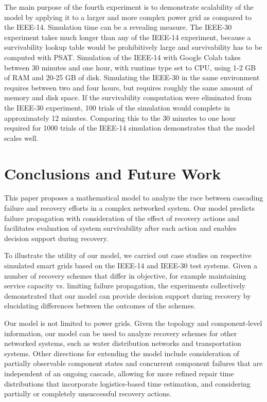 \documentclass[conference]{IEEEtran}
\begin{document}
The main purpose of the fourth experiment is to demonstrate scalability of the model by applying it to a larger and more complex power grid as compared to the IEEE-14. Simulation time can be a revealing measure. The IEEE-30 experiment takes much longer than any of the IEEE-14 experiment, because a survivability lookup table would be prohibitively large and survivability has to be computed with PSAT. Simulation of the IEEE-14 with Google Colab takes between 30 minutes and one hour, with runtime type set to CPU, using 1-2 GB of RAM and 20-25 GB of disk. Simulating the IEEE-30 in the same environment requires between two and four hours, but requires roughly the same amount of memory and disk space. If the survivability computation were eliminated from the IEEE-30 experiment, 100 trials of the simulation would complete in approximately 12 minutes. Comparing this to the 30 minutes to one hour required for 1000 trials of the IEEE-14 simulation demonstrates that the model scales well.

\section{Conclusions and Future Work}\label{sec:conclusions}

This paper proposes a mathematical model to analyze the race between cascading failure and recovery efforts in a complex networked system. Our model predicts failure propagation with consideration of the effect of recovery actions and facilitates evaluation of system survivability after each action and enables decision support during recovery.

To illustrate the utility of our model, we carried out case studies on respective simulated smart grids based on the IEEE-14 and IEEE-30 test systems. Given a number of recovery schemes that differ in objective, for example maintaining service capacity vs. limiting failure propagation, the experiments collectively demonstrated that our model can provide decision support during recovery by elucidating differences between the outcomes of the schemes.

Our model is not limited to power grids. Given the topology and component-level information, our model can be used to analyze recovery schemes for other networked systems, such as water distribution networks and transportation systems. Other directions for extending the model include consideration of partially observable component states and concurrent component failures that are independent of an ongoing cascade, allowing for more refined repair time distributions that incorporate logistics-based time estimation, and considering partially or completely unsuccessful recovery actions.





\end{document}

